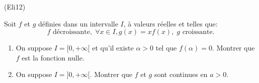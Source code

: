 \begin{tiny}(Eli12)\end{tiny} Soit $f$ et $g$ définies dans un intervalle $I$, à valeurs réelles et telles que:
\begin{displaymath}
f \text{ décroissante},\; \forall x \in I, g(x) = xf(x),\; g \text{ croissante.}  
\end{displaymath}
\begin{enumerate}
  \item On suppose $I= [0,+\infty[$ et qu'il existe $\alpha >0$ tel que $f(\alpha)=0$. Montrer que $f$ est la fonction nulle.
  \item On suppose $I= ]0,+\infty[$. Montrer que $f$ et $g$ sont continues en $a>0$.
\end{enumerate}

